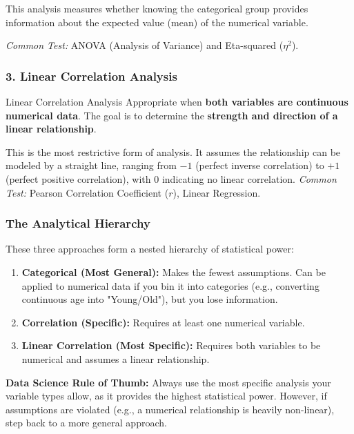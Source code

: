 This analysis measures whether knowing the categorical group provides information about the expected value (mean) of the numerical variable.

\vs
 \textit{Common Test:} ANOVA (Analysis of Variance) and Eta-squared ($\eta^2$).

\subsubsection{3. Linear Correlation Analysis}

\begin{defbox}{Linear Correlation Analysis}
Appropriate when \textbf{both variables are continuous numerical data}. The goal is to determine the \textbf{strength and direction of a linear relationship}.
\end{defbox}

This is the most restrictive form of analysis. It assumes the relationship can be modeled by a straight line, ranging from $-1$ (perfect inverse correlation) to $+1$ (perfect positive correlation), with $0$ indicating no linear correlation.
\newline \textit{Common Test:} Pearson Correlation Coefficient ($r$), Linear Regression.

\subsubsection{The Analytical Hierarchy}

These three approaches form a nested hierarchy of statistical power:
\begin{enumerate}
    \item \textbf{Categorical (Most General):} Makes the fewest assumptions. Can be applied to numerical data if you bin it into categories (e.g., converting continuous age into "Young/Old"), but you lose information.
    \item \textbf{Correlation (Specific):} Requires at least one numerical variable.
    \item \textbf{Linear Correlation (Most Specific):} Requires both variables to be numerical and assumes a linear relationship.
\end{enumerate}

\textbf{Data Science Rule of Thumb:} Always use the most specific analysis your variable types allow, as it provides the highest statistical power. However, if assumptions are violated (e.g., a numerical relationship is heavily non-linear), step back to a more general approach.

